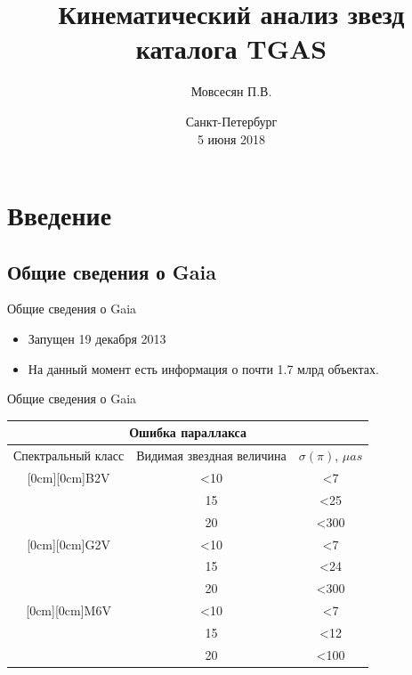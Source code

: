 \documentclass{beamer}
\title{Кинематический анализ звезд каталога TGAS}
\author{Мовсесян П.В.}
\date{Санкт-Петербург \\ 
5 июня 2018}
\institute[СПбГУ]{Санкт-Петербургский Государственный Университет\\ 
\vspace{0.4cm} 
Научный руководитель: Цветков А.С. \\ 
Рецензент: Малкин З.М.\\ 
}
\begin{document}
\begin{frame}
  \titlepage
\end{frame}



\section{Введение}

\subsection{Общие сведения о Gaia}

\begin{frame}{Общие сведения о Gaia}
\begin{itemize}
\item Запущен 19 декабря 2013
\item На данный момент есть информация о почти 1.7 млрд объектах.
\end{itemize}
\end{frame}

\begin{frame}{Общие сведения о Gaia}
\begin{tabular}{|c|c|c|}
\hline
\multicolumn{3}{|c|}{Ошибка параллакса}\\
\hline
Спектральный класс & Видимая звездная величина & $\sigma(\pi)$, $\mu as$\\
\hline
\raisebox{-4ex}[0cm][0cm]{B2V} &<10 &<7\\
\cline{2-3}
& 15 & <25\\
\cline{2-3}
& 20 & <300\\
\hline
\raisebox{-4ex}[0cm][0cm]{G2V} &<10 &<7\\
\cline{2-3}
& 15 & <24\\
\cline{2-3}
&20 & <300\\
\hline
\raisebox{-4ex}[0cm][0cm]{M6V} &<10 &<7\\
\cline{2-3}
& 15 & <12\\
\cline{2-3}
&20 & <100\\
\hline
\end{tabular}\\
\end{frame}
\end{document}
